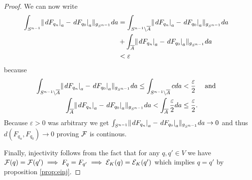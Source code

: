 \begin{proof}
We can now write 
\begin{align*}
    \int_{S^{n-1}} \lVert \left.dF_{q_n}\right\rvert_a - \left.dF_{q_0}\right\rvert_a \rVert_{g_{S^{n-1}}}da &= \int_{{S^{n-1}}\setminus{\overline{A}}}\lVert \left.dF_{q_n}\right\rvert_a - \left.dF_{q_0}\right\rvert_a \rVert_{g_{S^{n-1}}}da\\ &+ \int_{{\overline{A}}}\lVert \left.dF_{q_n}\right\rvert_a - \left.dF_{q_0}\right\rvert_a \rVert_{g_{S^{n-1}}}da\\
    &<\varepsilon
\end{align*} because 
\begin{align*}
    \int_{{S^{n-1}}\setminus{\overline{A}}}\lVert \left.dF_{q_n}\right\rvert_a - \left.dF_{q_0}\right\rvert_a \rVert_{g_{S^{n-1}}}da \leq \int_{{S^{n-1}} \setminus {\overline{A}}}cda &< \frac{\varepsilon}{2} \quad \text{ and}\\
    \int_{{\overline{A}}}\lVert \left.dF_{q_n}\right\rvert_a - \left.dF_{q_0}\right\rvert_a \rVert_{g_{S^{n-1}}}da < \int_{{\overline{A}}}\frac{\varepsilon}{2}da &\leq \frac{\varepsilon}{2}.
\end{align*}
Because $\varepsilon>0$ was arbitrary we get $\int_{{S^{n-1}}} \lVert \left.dF_{q_n}\right\rvert_a - \left.dF_{q_0}\right\rvert_a \rVert_{g_{S^{n-1}}}da \to 0$ and thus $d(F_{q_n},F_{q_0})\to 0$ proving $\mathcal{F}$ is continous.

Finally, injectivity follows from the fact that for any $q,q'\in V$ we have $\mathcal{F}(q)=\mathcal{F}(q')\implies F_q = F_{q'} \implies {{\mathcal{E}}_K}(q) = {{\mathcal{E}}_K}(q')$ which implies $q = q'$ by proposition \ref{prop:einj}.
\end{proof}

